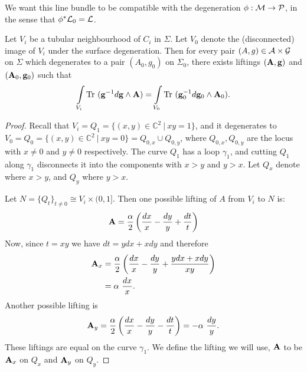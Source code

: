 	We want this line bundle to be compatible with the degeneration $\phi:\mathcal{M}\to\mathcal{P}$, in the sense that $\phi^\ast \mathcal{L}_0 = \mathcal{L}$.
	\begin{lemma}
		Let $V_i$ be a tubular neighbourhood of $C_i$ in $\Sigma$. Let $V_{0}$ denote the (disconnected) image of $V_i$ under the surface degeneration. Then for every pair $(A,g)\in\mathcal{A}\times \mathcal{G}$ on $\Sigma$ which degenerates to a pair $(A_0, g_0)$ on $\Sigma_0$, there exists liftings $(\mathbf{A},\mathbf{g})$ and $(\mathbf{A}_0,\mathbf{g}_0)$ such that
		\begin{equation}
			\int\limits_{V_i} \text{Tr }(\mathbf{g}^{-1}d\mathbf{g}\wedge \mathbf{A}) = \int\limits_{V_0} \text{Tr }(\mathbf{g}_0^{-1}d\mathbf{g}_0\wedge \mathbf{A}_0).
		\end{equation}
		\label{l:main-lemma}
	\end{lemma}
	\begin{proof}
		Recall that $V_i=Q_1 = \{(x,y)\in \mathbb{C}^2~|~ xy=1\}$, and it degenerates to $V_0 = Q_0 = \{(x,y)\in\mathbb{C}^2~|~xy=0\} = Q_{0,x} \cup Q_{0,y}$, where $Q_{0,x},Q_{0,y}$ are the locus with $x\neq0$ and $y\neq 0$ respectively. The curve $Q_1$ has a loop $\gamma_1$, and cutting $Q_1$ along $\gamma_1$ disconnects it into the components with $x>y$ and $y>x$. Let $Q_x$ denote where $x>y$, and $Q_y$ where $y>x$.
		
		Let $N=\{Q_t\}_{t\neq 0}\cong V_i\times(0,1]$. Then one possible lifting of $A$ from $V_i$ to $N$ is:
		\begin{equation}
			\mathbf{A} = \frac{\alpha}{2}\left(\frac{dx}{x}-\frac{dy}{y} + \frac{dt}{t}\right)
		\end{equation}
		Now, since $t=xy$ we have $dt =ydx+xdy$ and therefore
		\begin{align*}
			\mathbf{A}_x &= \frac{\alpha}{2}\left(\frac{dx}{x}-\frac{dy}{y} + \frac{ydx+xdy}{xy}\right)\\
			&= \alpha~ \frac{dx}{x}.
		\end{align*}
		Another possible lifting is 
		\begin{equation}
			\mathbf{A}_y = \frac{\alpha}{2}\left(\frac{dx}{x}-\frac{dy}{y} -  \frac{dt}{t}\right) = -\alpha~\frac{dy}{y}.
		\end{equation}
		These liftings are equal on the curve $\gamma_1$. We define the lifting we will use, $\mathbf{A}$ to be $\mathbf{A}_x$ on $Q_x$ and $\mathbf{A}_y$ on $Q_y$.
		

\end{proof}
